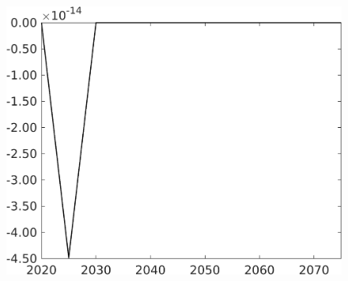 \documentclass[12pt]{article}
\begin{document}
\begin{figure}[h!!]
\begin{minipage}[]{0.32\textwidth}
	\end{minipage}	
	\begin{minipage}[]{0.32\textwidth}
		\includegraphics[width=1\textwidth]{../../codding_model/own_basedOnFried/optimalPol_010922_revision/figures/all_13Sept22/CompTaufPER_bytaul_Equlab_Reg0_F_spillover0_nsk0_xgr0_knspil1_sep0_LFlimit1_emsbase0_countec0_GovRev0_etaa0.79_lgd0.png}
	\end{minipage}	
\end{figure}
\end{document}
